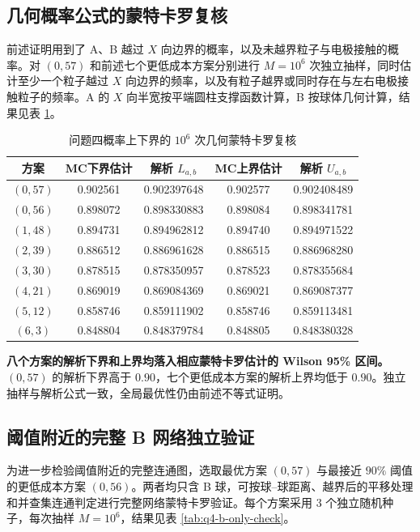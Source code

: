 \documentclass[withoutpreface,bwprint]{cumcmthesis}
\begin{document}
\subsection{几何概率公式的蒙特卡罗复核}

前述证明用到了 A、B 越过 $X$ 向边界的概率，以及未越界粒子与电极接触的概率。对 $(0,57)$ 和前述七个更低成本方案分别进行 $M=10^6$ 次独立抽样，同时估计至少一个粒子越过 $X$ 向边界的频率，以及有粒子越界或同时存在与左右电极接触粒子的频率。A 的 $X$ 向半宽按平端圆柱支撑函数计算，B 按球体几何计算，结果见表 \ref{tab:q4-strict-event-check}。

\begin{table}[H]
\centering
\small
\caption{问题四概率上下界的 $10^6$ 次几何蒙特卡罗复核}
\label{tab:q4-strict-event-check}
\begin{tabular}{ccccc}
\toprule
方案 & MC下界估计 & 解析 $L_{a,b}$ & MC上界估计 & 解析 $U_{a,b}$ \\
\midrule
$(0,57)$ & 0.902561 & 0.902397648 & 0.902577 & 0.902408489 \\
$(0,56)$ & 0.898072 & 0.898330883 & 0.898084 & 0.898341781 \\
$(1,48)$ & 0.894731 & 0.894962812 & 0.894740 & 0.894971522 \\
$(2,39)$ & 0.886512 & 0.886961628 & 0.886515 & 0.886968280 \\
$(3,30)$ & 0.878515 & 0.878350957 & 0.878523 & 0.878355684 \\
$(4,21)$ & 0.869019 & 0.869084369 & 0.869021 & 0.869087377 \\
$(5,12)$ & 0.858746 & 0.859111902 & 0.858746 & 0.859113481 \\
$(6,3)$  & 0.848804 & 0.848379784 & 0.848805 & 0.848380328 \\
\bottomrule
\end{tabular}
\end{table}

\textbf{八个方案的解析下界和上界均落入相应蒙特卡罗估计的 Wilson 95\% 区间。}$(0,57)$ 的解析下界高于 $0.90$，七个更低成本方案的解析上界均低于 $0.90$。独立抽样与解析公式一致，全局最优性仍由前述不等式证明。

\subsection{阈值附近的完整 B 网络独立验证}

为进一步检验阈值附近的完整连通图，选取最优方案 $(0,57)$ 与最接近 $90\%$ 阈值的更低成本方案 $(0,56)$。两者均只含 B 球，可按球--球距离、越界后的平移处理和并查集连通判定进行完整网络蒙特卡罗验证。每个方案采用 3 个独立随机种子，每次抽样 $M=10^6$，结果见表 \ref{tab:q4-b-only-check}。
\end{document}
